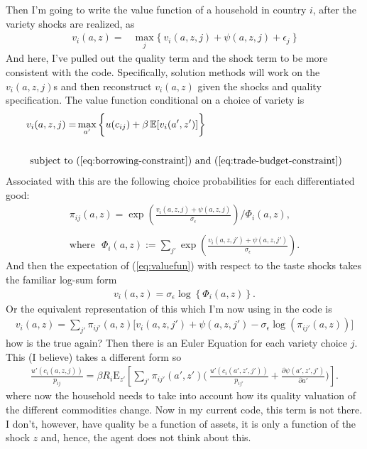 \documentclass[12pt,pdftex]{article}
\begin{document}
\begin{onehalfspacing}
Then I'm going to write the value function of a household in country $i$, after the variety shocks are realized, as
\begin{align}
v_{i}(a, z) = &  \max_{j} \big  \{ \  v_{i}(a, z, j) + \psi(a, z, j) + \epsilon_{j} \ \big \}
\end{align}
And here, I've pulled out the quality term and the shock term to be more consistent with the code. Specifically, solution methods will work on the $v_{i}(a, z, j)$s and then reconstruct $v_{i}(a, z)$ given the shocks and quality specification. The value function conditional on a choice of variety is
\begin{align}
v_{i}(a, z, j) = &  \max_{\ a' \ }\bigg  \{ u(c_{ij}) + \beta \, \mathbb{E} [v_{i}(a', z')]  \bigg\}\\
\nonumber \\
\mbox{subject to}  \ & (\ref{eq:borrowing-constraint}) \  \mathrm{and} \ (\ref{eq:trade-budget-constraint}) \nonumber
\end{align}
Associated with this are the following choice probabilities for each differentiated good:
\begin{align}
\pi_{ij}(a, z) = \exp \left( \frac{ v_{i}(a, z, j) + \psi(a, z, j) }{\sigma_{\epsilon}} \right) \Bigg / \Phi_{i}(a,z), \label{eq:choice-prob} \\
\nonumber \\
\mbox{where} \ \ \ \Phi_{i}(a,z) := \sum_{j'} \exp \left( \frac{ v_{i}(a, z, j') + \psi(a, z, j') }{\sigma_{\epsilon}} \right). \label{eq:big-phi}
\end{align}
And then the expectation of (\ref{eq:valuefun}) with respect to the taste shocks takes the familiar log-sum form
\begin{align}
v_i(a, z) = \sigma_{\epsilon} \log \left\{ \Phi_{i}(a,z)  \right\}.
\end{align}
Or the equivalent representation of this which I'm now using in the code is
\begin{align}
v_i(a, z) = \sum_{j'} \pi_{ij'}(a, z) \bigg[ v_{i}(a, z, j') + \psi(a, z, j') - \sigma_{\epsilon} \log (\pi_{ij'}(a, z))  \bigg]
\end{align}
how is the true again? Then there is an Euler Equation for each variety choice $j$. This (I believe) takes a different form so
\begin{align}
\frac{u'(c_{i}(a, z, j))}{p_{ij}} = \beta R_{i} \mathrm{E}_{z'} \left[ \sum_{j'} \pi_{ij'}(a', z') \bigg( \ \frac{u'(c_{i}(a', z', j'))}{p_{ij'}} + \frac{\partial \psi(a',z',j')}{\partial a'} \bigg) \right].
\end{align}
where now the household needs to take into account how its quality valuation of the different commodities change. Now in my current code, this term is not there. I don't, however, have quality be a function of assets, it is only a function of the shock $z$ and, hence, the agent does not think about this.



\newpage



\end{onehalfspacing}
\end{document}
